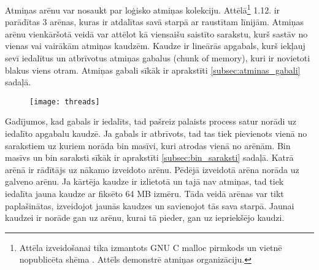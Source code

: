 Atmiņas arēnu var nosaukt par loģisko atmiņas kolekciju. Attēlā\footnote{Attēla izveidošanai tika izmantots GNU C malloc pirmkods \cite {MALLOC} un vietnē nopublicēta shēma \cite{AMM}. Attēls demonstrē atmiņas organizāciju.} 1.12. ir parādītas 3 arēnas, kuras ir atdalītas savā starpā ar raustītam līnijām.
 Atmiņas arēnu  vienkāršotā veidā var attēlot kā viensaišu saistīto sarakstu, kurš sastāv no vienas vai vairākām atmiņas kaudzēm. 
 Kaudze ir lineārās apgabals, kurš iekļauj sevī iedalītus un atbrīvotus atmiņas gabalus (chunk of memory), kuri ir novietoti blakus viens otram.
 Atmiņas gabali sīkāk ir aprakstīti \ref{subsec:atminas_gabali} sadaļā.
 \begin{figure}[h]
\begin{center}
\texttt{[image: threads]}
\end{center}
\caption{\textbf{\fontsize{11}{12}\selectfont {Atmiņas organizācija GNU C bibliotēkā (versija 2.3)}}}
\end{figure}
 Gadījumos, kad gabals ir iedalīts, tad pašreiz palaists process satur norādi uz iedalīto apgabalu kaudzē. 
 Ja gabals ir atbrīvots, tad tas tiek pievienots vienā no sarakstiem uz kuriem norāda bin masīvi, kuri atrodas vienā no arēnām.
Bin masīvs un bin saraksti sīkāk ir aprakstīti \ref{subsec:bin_saraksti} sadaļā. 
 Katrā arēnā ir rādītājs uz nākamo izveidoto arēnu. Pēdējā izveidotā arēna norāda uz galveno arēnu.
 Ja kārtēja kaudze ir izlietotā un tajā nav atmiņas, tad tiek iedalīta jauna kaudze ar fiksēto 64 MB izmēru.
  Tāda veidā arēnas var tikt paplašinātas, izveidojot jaunās kaudzes un savienojot tās sava starpā.
 Jaunai kaudzei ir norāde gan uz arēnu, kurai tā pieder, gan uz iepriekšējo kaudzi.


